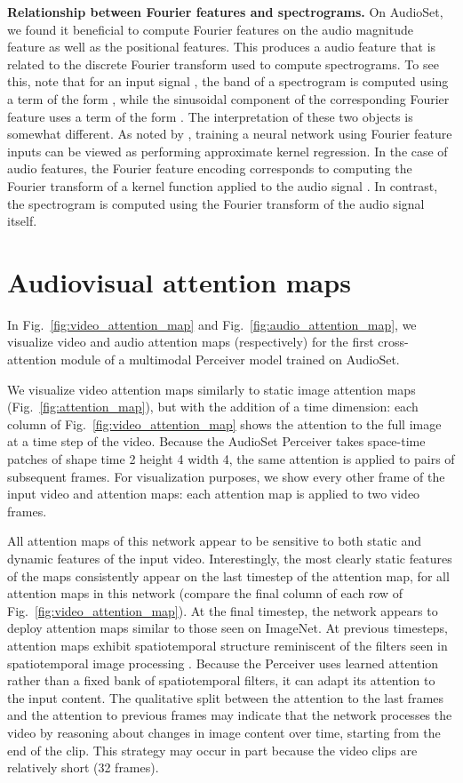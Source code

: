 \documentclass{article}
\begin{document}
\noindent \textbf{Relationship between Fourier features and spectrograms.} On AudioSet, we found it beneficial to compute Fourier features on the audio magnitude feature as well as the positional features. This produces a audio feature that is related to the discrete Fourier transform used to compute spectrograms. To see this, note that for an input signal , the  band of a spectrogram is computed using a term of the form , while the sinusoidal component of the corresponding Fourier feature uses a term of the form . The interpretation of these two objects is somewhat different. As noted by \cite{tancik2020fourier}, training a neural network using Fourier feature inputs can be viewed as performing approximate kernel regression. In the case of audio features, the Fourier feature encoding corresponds to computing the Fourier transform of a kernel function applied to the audio signal \cite{rahimi2007random, tancik2020fourier}. In contrast, the spectrogram is computed using the Fourier transform of the audio signal itself.

\section{Audiovisual attention maps}
\label{sec:audiovisual_viz}

In Fig.~\ref{fig:video_attention_map} and Fig.~\ref{fig:audio_attention_map}, we visualize video and audio attention maps (respectively) for the first cross-attention module of a multimodal Perceiver model trained on AudioSet. 

We visualize video attention maps similarly to static image attention maps (Fig.~\ref{fig:attention_map}), but with the addition of a time dimension: each column of Fig.~\ref{fig:video_attention_map} shows the attention to the full image at a time step of the video. Because the AudioSet Perceiver takes space-time patches of shape time 2  height 4  width 4, the same attention is applied to pairs of subsequent frames. For visualization purposes, we show every other frame of the input video and attention maps: each attention map is applied to two video frames.

All attention maps of this network appear to be sensitive to both static and dynamic features of the input video. Interestingly, the most clearly static features of the maps consistently appear on the last timestep of the attention map, for all attention maps in this network (compare the final column of each row of Fig.~\ref{fig:video_attention_map}). At the final timestep, the network appears to deploy attention maps similar to those seen on ImageNet. At previous timesteps, attention maps exhibit spatiotemporal structure reminiscent of the filters seen in spatiotemporal image processing \cite{adelson1985spatiotemporal, simoncelli1998model}. Because the Perceiver uses learned attention rather than a fixed bank of spatiotemporal filters, it can adapt its attention to the input content. The qualitative split between the attention to the last frames and the attention to previous frames may indicate that the network processes the video by reasoning about changes in image content over time, starting from the end of the clip. This strategy may occur in part because the video clips are relatively short (32 frames). 
\end{document}
